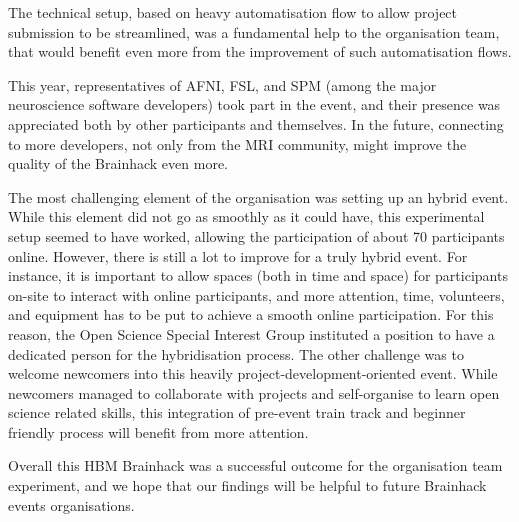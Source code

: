 \documentclass[10pt,a4paper,twocolumns]{proc}
\begin{document}
The technical setup, based on heavy automatisation flow to allow project
submission to be streamlined, was a fundamental help to the organisation
team, that would benefit even more from the improvement of such
automatisation flows.

This year, representatives of AFNI, FSL, and SPM (among the major
neuroscience software developers) took part in the event, and their
presence was appreciated both by other participants and themselves. In
the future, connecting to more developers, not only from the MRI
community, might improve the quality of the Brainhack even more.

The most challenging element of the organisation was setting up an
hybrid event. While this element did not go as smoothly as it could
have, this experimental setup seemed to have worked, allowing the
participation of about 70 participants online. However, there is still a
lot to improve for a truly hybrid event. For instance, it is important
to allow spaces (both in time and space) for participants on-site to
interact with online participants, and more attention, time, volunteers,
and equipment has to be put to achieve a smooth online participation.
For this reason, the Open Science Special Interest Group instituted a
position to have a dedicated person for the hybridisation process. The
other challenge was to welcome newcomers into this heavily
project-development-oriented event. While newcomers managed to
collaborate with projects and self-organise to learn open science
related skills, this integration of pre-event train track and beginner
friendly process will benefit from more attention.

Overall this HBM Brainhack was a successful outcome for the organisation
team experiment, and we hope that our findings will be helpful to future
Brainhack events organisations.

\printbibliography
\end{document}
